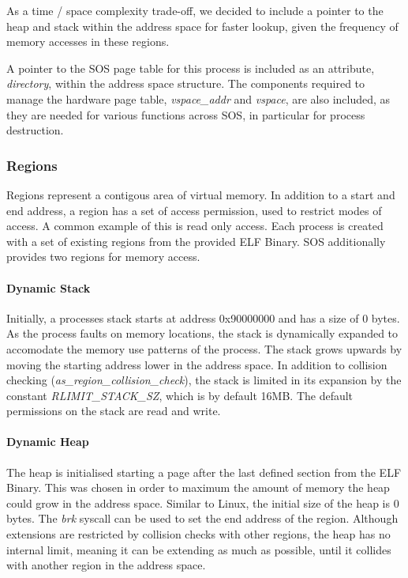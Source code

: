 \documentclass[runningheads,a4paper]{llncs}
\begin{document}
As a time / space complexity trade-off, we decided to include a pointer to the heap and stack within the address space for faster lookup, given the frequency of memory accesses in these regions. 


A pointer to the SOS page table for this process is included as an attribute, \textit{directory}, within the address space structure. The components required to manage the hardware page table, \textit{vspace\_addr} and \textit{vspace}, are also included, as they are needed for various functions across SOS, in particular for process destruction.

\subsubsection{Regions}

Regions represent a contigous area of virtual memory. In addition to a start and end address, a region has a set of access permission, used to restrict modes of access. A common example of this is read only access. Each process is created with a set of existing regions from the provided ELF Binary. SOS additionally provides two regions for memory access.

\paragraph{Dynamic Stack}

Initially, a processes stack starts at address 0x90000000 and has a size of 0 bytes. As the process faults on memory locations, the stack is dynamically expanded to accomodate the memory use patterns of the process. The stack grows upwards by moving the starting address  lower in the address space. In addition to collision checking (\textit{as\_region\_collision\_check}), the stack is limited in its expansion by the constant 
\textit{RLIMIT\_STACK\_SZ}, which is by default 16MB. The default permissions on the stack are read and write.

\paragraph{Dynamic Heap}

The heap is initialised starting a page after the last defined section from the ELF Binary. This was chosen in  order to maximum the amount of memory the heap could grow in the address space. Similar to Linux, the initial size of the heap is 0 bytes. The \textit{brk} syscall can be used to set the end address of the region. Although extensions are restricted by collision checks with other regions, the heap has no internal limit, meaning it can be extending as much as possible, until it collides with another region in the address space.
\end{document}
